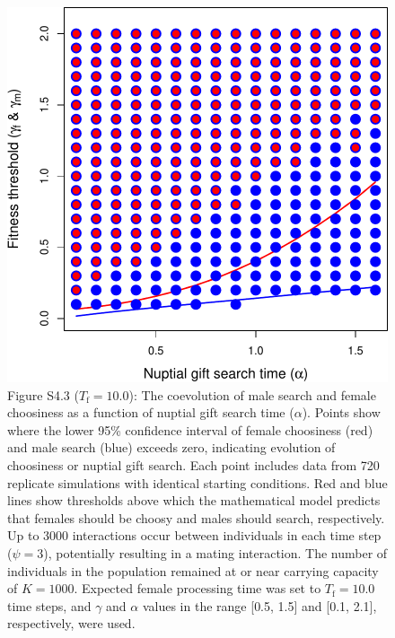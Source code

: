 \documentclass[
]{article}
\begin{document}
\captionsetup{labelformat=default}

\clearpage

\captionsetup{labelformat=empty}

\begin{figure}
\centering
\includegraphics{ms_refs_fixed_files/figure-latex/unnamed-chunk-8-1.pdf}
\caption{Figure S4.3 (\(T_{\mathrm{f}} = 10.0\)): The coevolution of
male search and female choosiness as a function of nuptial gift search
time (\(\alpha\)). Points show where the lower 95\% confidence interval
of female choosiness (red) and male search (blue) exceeds zero,
indicating evolution of choosiness or nuptial gift search. Each point
includes data from 720 replicate simulations with identical starting
conditions. Red and blue lines show thresholds above which the
mathematical model predicts that females should be choosy and males
should search, respectively. Up to 3000 interactions occur between
individuals in each time step (\(\psi = 3\)), potentially resulting in a
mating interaction. The number of individuals in the population remained
at or near carrying capacity of \(K = 1000\). Expected female processing
time was set to \(T_{\mathrm{f}}=10.0\) time steps, and \(\gamma\) and
\(\alpha\) values in the range {[}0.5, 1.5{]} and {[}0.1, 2.1{]},
respectively, were used.}
\end{figure}
\end{document}
